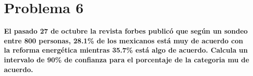\section*{Problema 6}

\textbf{El pasado 27 de octubre la revista forbes publicó que según un sondeo entre 800 personas, 28.1\% de los mexicanos está muy de acuerdo con la reforma energética mientras 35.7\% está algo de acuerdo. Calcula un intervalo de 90\% de confianza para el porcentaje de la categoria mu de acuerdo.}